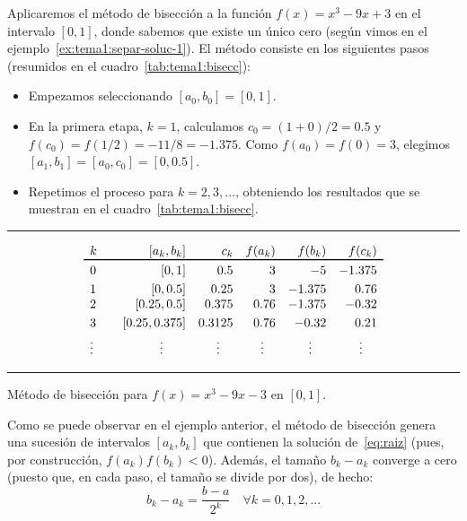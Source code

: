 \begin{example}
  Aplicaremos el método de bisección a la función $f(x)=x^3-9x+3$ en el intervalo
  $[0,1]$, donde sabemos que existe un único cero (según vimos en el
  ejemplo~\ref{ex:tema1:separ-soluc-1}). El método consiste en los
  siguientes pasos (resumidos en el cuadro~\ref{tab:tema1:bisecc}):

  \begin{itemize}
  \item Empezamos seleccionando $[a_0,b_0]=[0,1]$.
  \item En la primera etapa, $k=1$, calculamos
    $c_0=(1+0)/2=0.5$  y
    $f(c_0)=f(1/2)=-11/8=-1.375$. Como $f(a_0)=f(0)=3$, elegimos
    $[a_1,b_1]=[a_0,c_0]=[0,0.5]$.
  \item Repetimos el proceso para $k=2,3,...$, obteniendo los resultados que se
    muestran en el cuadro~\ref{tab:tema1:bisecc}.
  \end{itemize}

\end{example}
\begin{table}
  \centering
  \rule{0.99\linewidth}{1.6pt}
  \begin{equation*}
    \begin{array}{l<{\quad}rrrrr}%
      k &  [a_k,b_k] & c_k & f(a_k) & f(b_k) & f(c_k)
      \\ \toprule%
      0 & [0,1]  &  0.5 & 3 & -5 & -1.375
      \\ \noalign{\smallskip}
      1 &  [0,0.5] &  0.25 & 3 & -1.375 & 0.76
      \\ \smallskip
      2 & [0.25,0.5] & 0.375 & 0.76 & -1.375 & -0.32
      \\ \smallskip
      3& [0.25,0.375] & 0.3125 & 0.76 & -0.32 & 0.21
      \\
      \hfill \vdots \hfill~ & \hfill \vdots \hfill~ &
                                                      \hfill \vdots \hfill~ & \hfill \vdots \hfill~ &
                                                                                                      \hfill \vdots \hfill~ & \hfill \vdots \hfill~
    \end{array}
  \end{equation*}
  \rule{0.99\linewidth}{1.5pt}
  \caption{Método de bisección para $f(x)=x^3-9x-3$ en $[0,1]$.}
  \label{tab:tema1:bisecc}
\end{table}

Como se puede observar en el ejemplo anterior, el método de bisección
genera una sucesión de intervalos $[a_k,b_k]$ que
contienen la solución de~\eqref{eq:raiz} (pues, por construcción,
$f(a_k)f(b_k)<0$). Además, el tamaño $b_k-a_k$ converge a cero (puesto
que, en cada paso, el tamaño se divide por dos), de hecho:
\begin{equation}
  \label{eq:tema1:bisec:1}
  b_k-a_k = \frac{b-a}{2^k} \quad \forall k=0,1,2,...
\end{equation}

